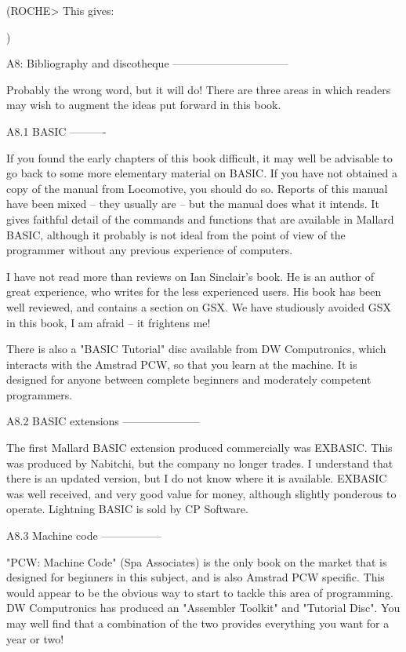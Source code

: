 (ROCHE> This gives:

$$$$
)


A8: Bibliography and discotheque
--------------------------------

Probably  the  wrong  word, but it will do! There are  three  areas  in  which 
readers may wish to augment the ideas put forward in this book.


A8.1 BASIC
----------

If  you  found  the  early chapters of this book difficult,  it  may  well  be 
advisable  to go back to some more elementary material on BASIC. If  you  have 
not  obtained a copy of the manual from Locomotive, you should do so.  Reports 
of this manual have been mixed -- they usually are -- but the manual does what 
it  intends. It gives faithful detail of the commands and functions  that  are 
available  in Mallard BASIC, although it probably is not ideal from the  point 
of view of the programmer without any previous experience of computers.

I  have not read more than reviews on Ian Sinclair's book. He is an author  of 
great experience, who writes for the less experienced users. His book has been 
well  reviewed, and contains a section on GSX. We have studiously avoided  GSX 
in this book, I am afraid -- it frightens me!

There  is also a "BASIC Tutorial" disc available from DW  Computronics,  which 
interacts  with  the  Amstrad PCW, so that you learn at  the  machine.  It  is 
designed  for  anyone  between complete  beginners  and  moderately  competent 
programmers.


A8.2 BASIC extensions
---------------------

The first Mallard BASIC extension produced commercially was EXBASIC. This  was 
produced  by  Nabitchi, but the company no longer trades.  I  understand  that 
there is an updated version, but I do not know where it is available.  EXBASIC 
was well received, and very good value for money, although slightly  ponderous 
to operate. Lightning BASIC is sold by CP Software.


A8.3 Machine code
-----------------

"PCW:  Machine Code" (Spa Associates) is the only book on the market  that  is 
designed for beginners in this subject, and is also Amstrad PCW specific. This 
would  appear  to  be  the  obvious  way to  start  to  tackle  this  area  of 
programming. DW Computronics has produced an "Assembler Toolkit" and "Tutorial 
Disc". You may well find that a combination of the two provides everything you 
want for a year or two!

